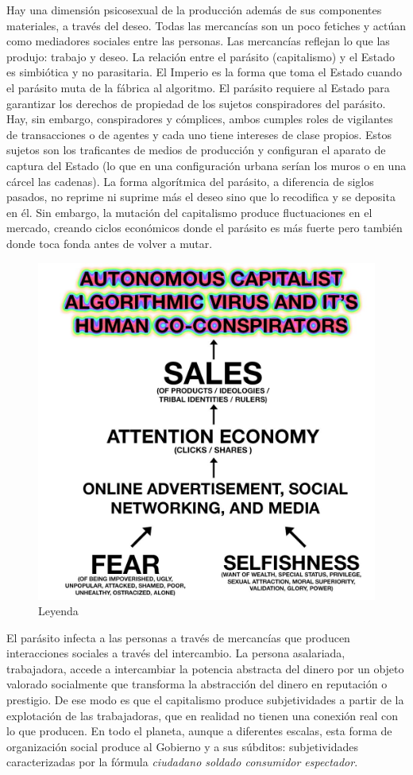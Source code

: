 Hay una dimensión psicosexual de la producción además de sus componentes materiales, a través del deseo. Todas las mercancías son un poco fetiches y actúan como mediadores sociales entre las personas. Las mercancías reflejan lo que las produjo: trabajo y deseo. La relación entre el parásito (capitalismo) y el Estado es simbiótica y no parasitaria. El Imperio es la forma que toma el Estado cuando el parásito muta de la fábrica al algoritmo. El parásito requiere al Estado para garantizar los derechos de propiedad de los sujetos conspiradores del parásito. Hay, sin embargo, conspiradores y cómplices, ambos cumples roles de vigilantes de transacciones o de agentes y cada uno tiene intereses de clase propios. Estos sujetos son los traficantes de medios de producción y configuran el aparato de captura del Estado (lo que en una configuración urbana serían los muros o en una cárcel las cadenas). La forma algorítmica del parásito, a diferencia de siglos pasados, no reprime ni suprime más el deseo sino que lo recodifica y se deposita en él. Sin embargo, la mutación del capitalismo produce fluctuaciones en el mercado, creando ciclos económicos donde el parásito es más fuerte pero también donde toca fonda antes de volver a mutar.

\begin{figure}[htb]
  \centering
  \includegraphics[width=0.7\linewidth]{images/algorithm-capitalism.png}
  \caption{Leyenda}
  \label{fig:algocap}
\end{figure}

El parásito infecta a las personas a través de mercancías que producen interacciones sociales a través del intercambio. La persona asalariada, trabajadora, accede a intercambiar la potencia abstracta del dinero por un objeto valorado socialmente que transforma la abstracción del dinero en reputación o prestigio. De ese modo es que el capitalismo produce subjetividades a partir de la explotación de las trabajadoras, que en realidad no tienen una conexión real con lo que producen. En todo el planeta, aunque a diferentes escalas, esta forma de organización social produce al Gobierno y a sus súbditos: subjetividades caracterizadas por la fórmula \emph{ciudadano soldado consumidor espectador}.

